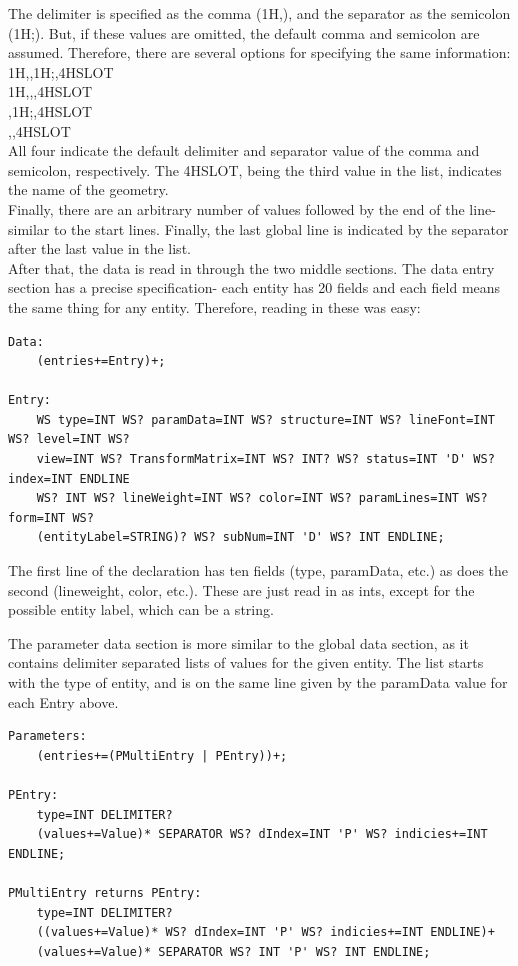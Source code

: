 The delimiter is specified as the comma (1H,), and the separator as the semicolon (1H;). But, if these values are omitted, the default comma and semicolon are assumed. Therefore, there are several options for specifying the same information:\\
1H,,1H;,4HSLOT\\
1H,,,4HSLOT\\
,1H;,4HSLOT\\
,,4HSLOT\\
All four indicate the default delimiter and separator value of the comma and semicolon, respectively. The 4HSLOT, being the third value in the list, indicates the name of the geometry. \\
Finally, there are an arbitrary number of values followed by the end of the line- similar to the start lines. Finally, the last global line is indicated by the separator after the last value in the list.\\
After that, the data is read in through the two middle sections. The data entry section has a precise specification- each entity has 20 fields and each field means the same thing for any entity. Therefore, reading in these was easy:
\begin{Verbatim}
Data:
    (entries+=Entry)+;

Entry:
    WS type=INT WS? paramData=INT WS? structure=INT WS? lineFont=INT WS? level=INT WS?
    view=INT WS? TransformMatrix=INT WS? INT? WS? status=INT 'D' WS? index=INT ENDLINE
    WS? INT WS? lineWeight=INT WS? color=INT WS? paramLines=INT WS? form=INT WS?
    (entityLabel=STRING)? WS? subNum=INT 'D' WS? INT ENDLINE;
\end{Verbatim}

  The first line of the declaration has ten fields (type, paramData, etc.) as does the second (lineweight, color, etc.). These are just read in as ints, except for the possible entity label, which can be a string.

  The parameter data section is more similar to the global data section, as it contains delimiter separated lists of values for the given entity. The list starts with the type of entity, and is on the same line given by the paramData value for each Entry above.

\begin{Verbatim}
Parameters:
    (entries+=(PMultiEntry | PEntry))+;

PEntry:
    type=INT DELIMITER?
    (values+=Value)* SEPARATOR WS? dIndex=INT 'P' WS? indicies+=INT ENDLINE;

PMultiEntry returns PEntry:
    type=INT DELIMITER?
    ((values+=Value)* WS? dIndex=INT 'P' WS? indicies+=INT ENDLINE)+
    (values+=Value)* SEPARATOR WS? INT 'P' WS? INT ENDLINE;
\end{Verbatim}

